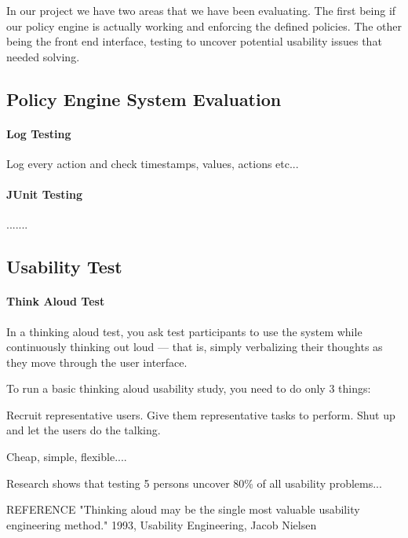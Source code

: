 In our project we have two areas that we have been evaluating. The first being if our policy engine is actually working and enforcing the defined policies. The other being the front end interface, testing to uncover potential usability issues that needed solving.

\subsection{Policy Engine System Evaluation}

\paragraph{Log Testing}

Log every action and check timestamps, values, actions etc...

\paragraph{JUnit Testing}
.......

\subsection{Usability Test}

\paragraph{Think Aloud Test}

In a thinking aloud test, you ask test participants to use the system while continuously thinking out loud — that is, simply verbalizing their thoughts as they move through the user interface.

To run a basic thinking aloud usability study, you need to do only 3 things:

Recruit representative users.
Give them representative tasks to perform. %
Shut up and let the users do the talking.


Cheap, simple, flexible....

Research shows that testing 5 persons uncover 80\% of all usability problems...


REFERENCE
"Thinking aloud may be the single most valuable usability engineering method." 1993, Usability Engineering, Jacob Nielsen


